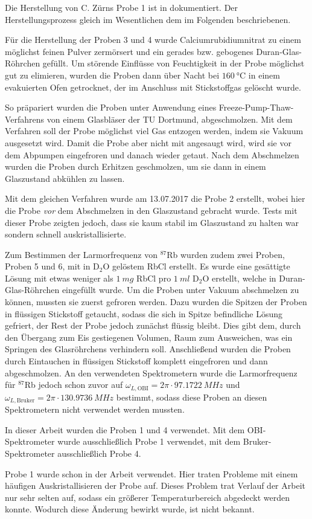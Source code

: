 Die Herstellung von C. Zürns Probe 1 ist in \cite{zuern_arbeit} dokumentiert. Der Herstellungsprozess gleich im Wesentlichen dem im Folgenden beschriebenen.

Für die Herstellung der Proben 3 und 4 wurde Calciumrubidiumnitrat zu einem möglichst feinen Pulver zermörsert und ein gerades bzw. gebogenes Duran-Glas-Röhrchen gefüllt. Um störende Einflüsse von Feuchtigkeit in der Probe möglichst gut zu elimieren, wurden die Proben dann über Nacht bei $\SI{160}{\degreeCelsius}$ in einem evakuierten Ofen getrocknet, der im Anschluss mit Stickstoffgas gelöscht wurde.

So präpariert wurden die Proben unter Anwendung eines Freeze-Pump-Thaw-Ver\-fah\-rens von einem Glasbläser der TU Dortmund, abgeschmolzen. Mit dem Verfahren soll der Probe möglichst viel Gas entzogen werden, indem sie Vakuum ausgesetzt wird. Damit die Probe aber nicht mit angesaugt wird, wird sie vor dem Abpumpen eingefroren und danach wieder getaut. Nach dem Abschmelzen wurden die Proben durch Erhitzen geschmolzen, um sie dann in einem Glaszustand abkühlen zu lassen.

Mit dem gleichen Verfahren wurde am 13.07.2017 die Probe 2 erstellt, wobei hier die Probe \emph{vor} dem Abschmelzen in den Glaszustand gebracht wurde. Tests mit dieser Probe zeigten jedoch, dass sie kaum stabil im Glaszustand zu halten war sondern schnell auskristallisierte.

Zum Bestimmen der Larmorfrequenz von $^\text{87}$Rb wurden zudem zwei Proben, Proben 5 und 6, mit in D$_\text{2}$O gelöstem RbCl erstellt. Es wurde eine gesättigte Lösung mit etwas weniger als $\SI{1}{mg}$ RbCl pro $\SI{1}{ml}$ D$_\text{2}$O erstellt, welche in Duran-Glas-Röhrchen eingefüllt wurde. Um die Proben unter Vakuum abschmelzen zu können, mussten sie zuerst gefroren werden. Dazu wurden die Spitzen der Proben in flüssigen Stickstoff getaucht, sodass die sich in Spitze befindliche Lösung gefriert, der Rest der Probe jedoch zunächst flüssig bleibt. Dies gibt dem, durch den Übergang zum Eis gestiegenen Volumen, Raum zum Ausweichen, was ein Springen des Glasröhrchens verhindern soll. Anschließend wurden die Proben durch Eintauchen in flüssigen Stickstoff komplett eingefroren und dann abgeschmolzen. An den verwendeten Spektrometern wurde die Larmorfrequenz für $^\text{87}$Rb jedoch schon zuvor auf $\omega_{L, \text{OBI}} = 2\pi \cdot \SI{97.1722}{MHz}$ und $\omega_{L, \text{Bruker}} = 2\pi \cdot \SI{130.9736}{MHz}$ bestimmt, sodass diese Proben an diesen Spektrometern nicht verwendet werden mussten.

In dieser Arbeit wurden die Proben 1 und 4 verwendet. Mit dem OBI-Spektrometer wurde ausschließlich Probe 1 verwendet, mit dem Bruker-Spektrometer ausschließlich Probe 4.

Probe 1 wurde schon in der Arbeit \cite{joachim_master} verwendet. Hier traten Probleme mit einem häufigen Auskristallisieren der Probe auf. Dieses Problem trat Verlauf der Arbeit nur sehr selten auf, sodass ein größerer Temperaturbereich abgedeckt werden konnte. Wodurch diese Änderung bewirkt wurde, ist nicht bekannt.

